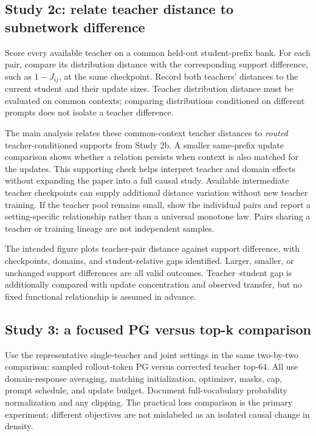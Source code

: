 \subsection{Study 2c: relate teacher distance to subnetwork difference}

Score every available teacher on a common held-out student-prefix bank.
For each pair, compare its distribution distance with the corresponding
support difference, such as $1-J_{ij}$, at the same checkpoint. Record
both teachers' distances to the current student and their update sizes.
Teacher distribution distance must be evaluated on common contexts;
comparing distributions conditioned on different prompts does not
isolate a teacher difference.

The main analysis relates these common-context teacher distances to
\emph{routed} teacher-conditioned supports from Study 2b. A smaller
same-prefix update comparison shows whether a relation persists when
context is also matched for the updates. This supporting check helps
interpret teacher and domain effects without expanding the paper into
a full causal study. Available intermediate teacher checkpoints can
supply additional distance variation without new teacher training.
If the teacher pool remains small, show the individual pairs and report
a setting-specific relationship rather than a universal monotone law.
Pairs sharing a teacher or training lineage are not independent samples.

The intended figure plots teacher-pair distance against support
difference, with checkpoints, domains, and student-relative gaps
identified. Larger, smaller, or unchanged support differences are all
valid outcomes. Teacher--student gap is additionally compared with
update concentration and observed transfer, but no fixed functional
relationship is assumed in advance.

\subsection{Study 3: a focused PG versus top-k comparison}

Use the representative single-teacher and joint settings in the
same two-by-two comparison: sampled rollout-token PG versus corrected
teacher top-$64$. All use domain-response averaging, matching
initialization, optimizer, masks, cap, prompt schedule, and update budget.
Document full-vocabulary probability normalization and any clipping.
The practical loss comparison is the primary experiment; different
objectives are not mislabeled as an isolated causal change in density.

